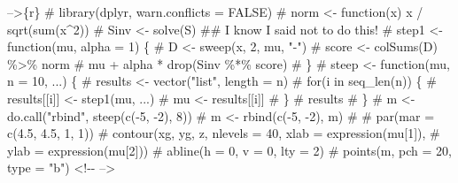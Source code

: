 \documentclass[ignorenonframetext,aspectratio=169]{beamer}
\begin{document}
{{{--\textgreater{}}{\{r\} \# library(dplyr, warn.conflicts = FALSE) \# norm \textless{}- function(x) x / sqrt(sum(x\^{}2)) \# Sinv \textless{}- solve(S)  \#\# I know I said not to do this! \# step1 \textless{}- function(mu, alpha = 1) \{ \#         D \textless{}- sweep(x, 2, mu, "-") \#         score \textless{}- colSums(D) \%\textgreater{}\% norm \#         mu + alpha * drop(Sinv \%*\% score) \# \} \# steep \textless{}- function(mu, n = 10, ...) \{ \#         results \textless{}- vector("list", length = n) \#         for(i in seq\_len(n)) \{ \#                 results{[}{[}i{]}{]} \textless{}- step1(mu, ...) \#                 mu \textless{}- results{[}{[}i{]}{]} \#         \} \#         results \# \} \# m \textless{}- do.call("rbind", steep(c(-5, -2), 8)) \# m \textless{}- rbind(c(-5, -2), m) \#  \# par(mar = c(4.5, 4.5, 1, 1)) \# contour(xg, yg, z, nlevels = 40, xlab = expression(mu{[}1{]}),  \#         ylab = expression(mu{[}2{]})) \# abline(h = 0, v = 0, lty = 2) \# points(m, pch = 20, type = "b") \textless{}!-\/- --\textgreater{}}}\label{r-librarydplyr-warn.conflicts-false-norm---functionx-x-sqrtsumx2-sinv---solves-i-know-i-said-not-to-do-this-step1---functionmu-alpha-1-d---sweepx-2-mu---score---colsumsd-norm-mu-alpha-dropsinv-score-steep---functionmu-n-10-...-results---vectorlist-length-n-fori-in-seq_lenn-resultsi---step1mu-...-mu---resultsi-results-m---do.callrbind-steepc-5--2-8-m---rbindc-5--2-m-parmar-c4.5-4.5-1-1-contourxg-yg-z-nlevels-40-xlab-expressionmu1-ylab-expressionmu2-ablineh-0-v-0-lty-2-pointsm-pch-20-type-b---}}
\end{document}
